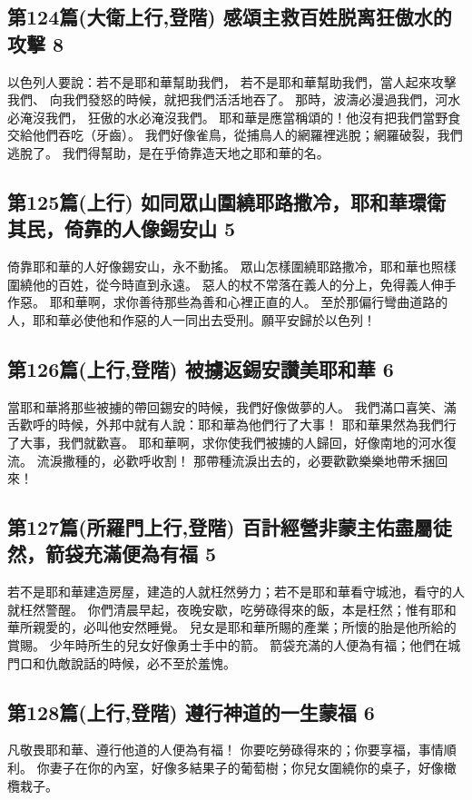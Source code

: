 \subsection{第124篇(大衛上行,登階) 感頌主救百姓脱离狂傲水的攻擊 8}
以色列人要說：若不是耶和華幫助我們，
若不是耶和華幫助我們，當人起來攻擊我們、
向我們發怒的時候，就把我們活活地吞了。
那時，波濤必漫過我們，河水必淹沒我們，
狂傲的水必淹沒我們。
耶和華是應當稱頌的！他沒有把我們當野食交給他們吞吃（牙齒）。
我們好像雀鳥，從捕鳥人的網羅裡逃脫；網羅破裂，我們逃脫了。
我們得幫助，是在乎倚靠造天地之耶和華的名。


\subsection{第125篇(上行) 如同眾山圍繞耶路撒冷，耶和華環衛其民，倚靠的人像錫安山 5}
倚靠耶和華的人好像錫安山，永不動搖。
眾山怎樣圍繞耶路撒冷，耶和華也照樣圍繞他的百姓，從今時直到永遠。
惡人的杖不常落在義人的分上，免得義人伸手作惡。
耶和華啊，求你善待那些為善和心裡正直的人。
至於那偏行彎曲道路的人，耶和華必使他和作惡的人一同出去受刑。願平安歸於以色列！

\subsection{第126篇(上行,登階) 被擄返錫安讚美耶和華 6}
當耶和華將那些被擄的帶回錫安的時候，我們好像做夢的人。
我們滿口喜笑、滿舌歡呼的時候，外邦中就有人說：耶和華為他們行了大事！
耶和華果然為我們行了大事，我們就歡喜。
耶和華啊，求你使我們被擄的人歸回，好像南地的河水復流。
流淚撒種的，必歡呼收割！
那帶種流淚出去的，必要歡歡樂樂地帶禾捆回來！


\subsection{第127篇(所羅門上行,登階) 百計經營非蒙主佑盡屬徒然，箭袋充滿便為有福 5}
若不是耶和華建造房屋，建造的人就枉然勞力；若不是耶和華看守城池，看守的人就枉然警醒。
你們清晨早起，夜晚安歇，吃勞碌得來的飯，本是枉然；惟有耶和華所親愛的，必叫他安然睡覺。
兒女是耶和華所賜的產業；所懷的胎是他所給的賞賜。
少年時所生的兒女好像勇士手中的箭。
箭袋充滿的人便為有福；他們在城門口和仇敵說話的時候，必不至於羞愧。


\subsection{第128篇(上行,登階) 遵行神道的一生蒙福 6}
凡敬畏耶和華、遵行他道的人便為有福！
你要吃勞碌得來的；你要享福，事情順利。
你妻子在你的內室，好像多結果子的葡萄樹；你兒女圍繞你的桌子，好像橄欖栽子。

